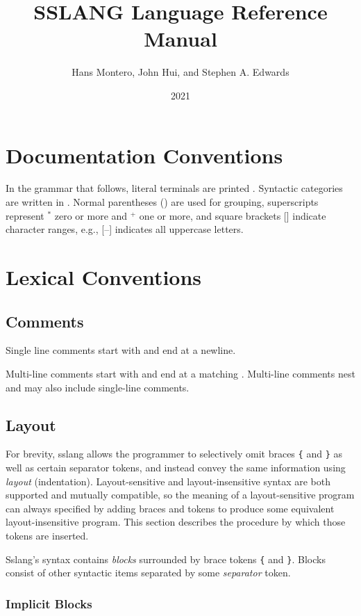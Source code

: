 \documentclass{article}
\title{SSLANG Language Reference Manual}
\author{Hans Montero, John Hui, and Stephen A. Edwards}
\date{2021}
\def\<#1>{\synt{#1}}
\begin{document}
\maketitle

\section{Documentation Conventions}

In the grammar that follows, literal terminals are printed .  Syntactic categories are written in \<italics>.
Normal parentheses () are used for grouping, superscripts represent
$^*$ zero or more and $^+$ one or more, and square brackets []
indicate character ranges, e.g., [--] indicates all
uppercase letters.

\section{Lexical Conventions}

\subsection{Comments}

Single line comments start with \lit*{//} and end at a newline.

Multi-line comments start with \lit*{/*} and end at a matching
\lit*{*/}.  Multi-line comments nest and may also include
single-line comments.

\subsection{Layout}

For brevity, sslang allows the programmer to selectively omit braces \texttt{\{} and \texttt{\}} as well as certain separator tokens, and instead convey the same information using \emph{layout} (indentation). Layout-sensitive and layout-insensitive syntax are both supported and mutually compatible, so the meaning of a layout-sensitive program can always specified by adding braces and tokens to produce some equivalent layout-insensitive program. This section describes the procedure by which those tokens are inserted.

Sslang's syntax contains \emph{blocks} surrounded by brace tokens \texttt{\{} and \texttt{\}}. Blocks consist of other syntactic items separated by some \emph{separator} token.

\subsubsection{Implicit Blocks}
\end{document}
